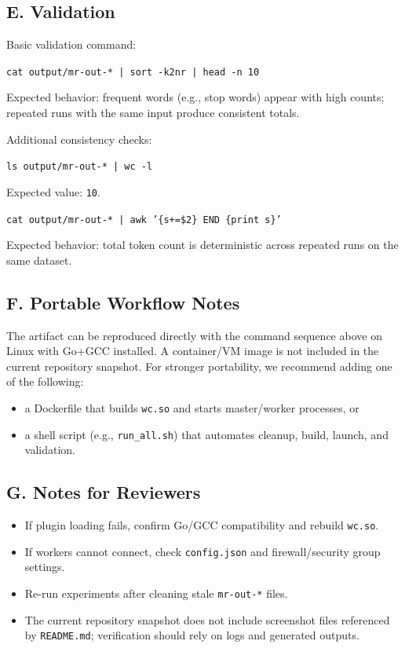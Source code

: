 \documentclass[12pt]{article}
\begin{document}
\subsection*{E. Validation}
Basic validation command:
\begin{center}
\texttt{cat output/mr-out-* | sort -k2nr | head -n 10}
\end{center}
Expected behavior: frequent words (e.g., stop words) appear with high counts; repeated runs with the same input produce consistent totals.

Additional consistency checks:
\begin{center}
\texttt{ls output/mr-out-* | wc -l}
\end{center}
Expected value: \texttt{10}.

\begin{center}
\texttt{cat output/mr-out-* | awk '\{s+=\$2\} END \{print s\}'}
\end{center}
Expected behavior: total token count is deterministic across repeated runs on the same dataset.

\subsection*{F. Portable Workflow Notes}
The artifact can be reproduced directly with the command sequence above on Linux with Go+GCC installed. A container/VM image is not included in the current repository snapshot. For stronger portability, we recommend adding one of the following:
\begin{itemize}[leftmargin=1.5em]
  \item a Dockerfile that builds \texttt{wc.so} and starts master/worker processes, or
  \item a shell script (e.g., \texttt{run\_all.sh}) that automates cleanup, build, launch, and validation.
\end{itemize}

\subsection*{G. Notes for Reviewers}
\begin{itemize}[leftmargin=1.5em]
  \item If plugin loading fails, confirm Go/GCC compatibility and rebuild \texttt{wc.so}.
  \item If workers cannot connect, check \texttt{config.json} and firewall/security group settings.
  \item Re-run experiments after cleaning stale \texttt{mr-out-*} files.
  \item The current repository snapshot does not include screenshot files referenced by \texttt{README.md}; verification should rely on logs and generated outputs.
\end{itemize}
\end{document}
